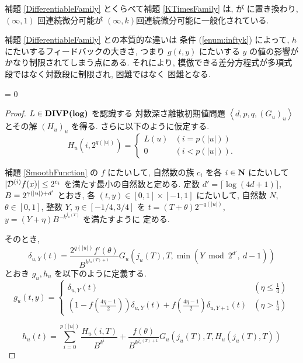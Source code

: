 補題 \ref{DifferentiableFamily} とくらべて補題 \ref{KTimesFamily} は,
\PSPACE が \DIVPlog に置き換わり, $(\infty, 1)$ 回連続微分可能が 
$(\infty, k)$回連続微分可能に一般化されている.

補題 \ref{DifferentiableFamily} との本質的な違いは
条件 (\ref{enum:inftyk}) によって, $h$ にたいするフィードバックの大きさ,
つまり $g(t,y)$ にたいする $y$ の値の影響がかなり制限されてしまう点にある.
それにより, 模倣できる差分方程式が多項式段ではなく対数段に制限され,
\PSPACE 困難ではなく \DIVPlog 困難となる.





\ifnum \proc = 0
 \begin{proof}
  $L \in \text{\bf DIVP(log)}$ を認識する
  対数深さ離散初期値問題 $\left< d, p, q,(G_u)_u \right>$
  とその解 $(H_u)_u$ を得る. さらに以下のように仮定する.
  \begin{equation}
   H_u(i, 2^{q(|u|)}) = \begin{cases}
			L(u) & (i=p(|u|)) \\
			0 & (i<p(|u|)).
			\end{cases}
  \end{equation}

  補題 \ref{SmoothFunction} の $f$ にたいして, 
  自然数の族 $c_i$ を各 $i \in \mathbf N$ にたいして 
  $|\mathcal D^{(i)}f(x)| \le 2^{c_i}$ を満たす最小の自然数と定める.
 定数 $d' = \lceil \log (4d + 1) \rceil$, 
 $B = 2^{{\gamma(|u|)} + d'}$ とおき, 
 各 $(t, y) \in [0,1] \times [-1, 1]$ にたいして,
 自然数 $N$, $\theta \in [0,1]$, 整数 $Y$, $\eta \in [-1/4, 3/4]$ を
 $t = (T + \theta)2^{-q(|u|)}$, $y = (Y + \eta)B^{-k^{j_u(T)}}$ を満たすように
 定める.
 
 そのとき,
 \begin{equation}
  \delta_{u, Y} (t) = \frac{2^{q(|u|)} f'(\theta)}{B^{k^{j_u(T)+1}}} 
   G_u\left( j_u(T), T, \min \left(Y \bmod 2^{d'}\!\!\!,\ d-1 \right) \right)
 \end{equation}
 とおき $g_u, h_u$ を以下のように定義する.
 \begin{equation}
  g_u(t,y) 
  = \begin{cases}
     \delta_{u, Y}(t)
     & (\eta \le \frac 1 4)
     \\
     ( 1-f ( \frac{4\eta-1}{2})) \delta_{u, Y}(t) 
     + f ( \frac{4\eta-1}{2}) \delta_{u,Y+1}(t)
     & (\eta > \frac 1 4)
    \end{cases}
 \end{equation}

 \begin{equation} 
  h_u(t) = \sum^{p(|u|)}_{i=0} \frac{H_u(i, T)}{B^{k^i}}  
  + \frac{f(\theta)}{B^{k^{j_u(T)+1}}} G_u(j_u(T), T, H_u(j_u(T), T)) 
  \label{eq:hu}
 \end{equation}


\end{proof}
